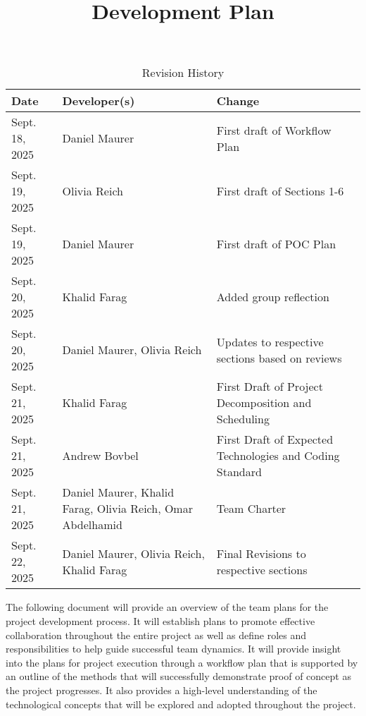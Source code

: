 \documentclass{article}
\title{Development Plan\\\progname}
\author{\authname}
\date{}
\begin{document}
\maketitle

\begin{table}[hp]
\caption{Revision History} \label{TblRevisionHistory}
\begin{tabularx}{\textwidth}{llX}
\toprule
\textbf{Date} & \textbf{Developer(s)} & \textbf{Change}\\
\midrule
Sept. 18, 2025 & Daniel Maurer & First draft of Workflow Plan\\
Sept. 19, 2025 & Olivia Reich & First draft of Sections 1-6\\
Sept. 19, 2025 & Daniel Maurer & First draft of POC Plan\\
Sept. 20, 2025 & Khalid Farag & Added group reflection\\
Sept. 20, 2025 & Daniel Maurer, Olivia Reich & Updates to respective sections based on reviews\\
Sept. 21, 2025 & Khalid Farag & First Draft of Project Decomposition and Scheduling\\
Sept. 21, 2025 & Andrew Bovbel & First Draft of Expected Technologies and Coding Standard\\
Sept. 21, 2025 & Daniel Maurer, Khalid Farag, Olivia Reich, Omar Abdelhamid & Team Charter\\
Sept. 22, 2025 & Daniel Maurer, Olivia Reich, Khalid Farag & Final Revisions to respective sections\\
\bottomrule
\end{tabularx}
\end{table}

\newpage{}

\iffalse
\wss{Put your introductory blurb here.  Often the blurb is a brief roadmap of
what is contained in the report.}

\wss{Additional information on the development plan can be found in the
\href{https://gitlab.cas.mcmaster.ca/courses/capstone/-/blob/main/Lectures/L02b_POCAndDevPlan/POCAndDevPlan.pdf?ref_type=heads}
{lecture slides}.}
\fi

The following document will provide an overview of the team plans for the project development process. It will
establish plans to promote effective collaboration throughout the entire project as well as define roles and
responsibilities to help guide successful team dynamics. It will provide insight into the plans for project
execution through a workflow plan that is supported by an outline of the methods that will successfully demonstrate
proof of concept as the project progresses. It also provides a high-level understanding of the technological
concepts that will be explored and adopted throughout the project.
\end{document}
